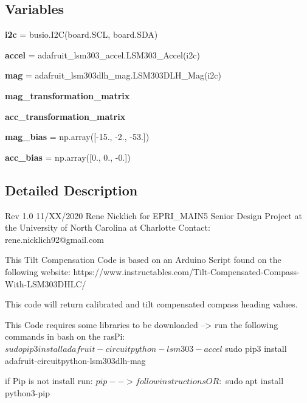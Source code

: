 \subsection*{Variables}
\begin{DoxyCompactItemize}
\item 
\mbox{\label{namespacemcs_1_1firmware_1_1lsm303dlhc_a2306e89ef0782283d496ce7141de2327}} 
{\bfseries i2c} = busio.\+I2C(board.\+S\+CL, board.\+S\+DA)
\item 
\mbox{\label{namespacemcs_1_1firmware_1_1lsm303dlhc_aefaaa0ccd56bd1aaf195733637535400}} 
{\bfseries accel} = adafruit\+\_\+lsm303\+\_\+accel.\+L\+S\+M303\+\_\+\+Accel(i2c)
\item 
\mbox{\label{namespacemcs_1_1firmware_1_1lsm303dlhc_aa61499d7e7a4675cc58185f941e1c4e2}} 
{\bfseries mag} = adafruit\+\_\+lsm303dlh\+\_\+mag.\+L\+S\+M303\+D\+L\+H\+\_\+\+Mag(i2c)
\item 
{\bfseries mag\+\_\+transformation\+\_\+matrix}
\item 
{\bfseries acc\+\_\+transformation\+\_\+matrix}
\item 
\mbox{\label{namespacemcs_1_1firmware_1_1lsm303dlhc_a3307f6f7c39bd45e8af32a162a7e33f3}} 
{\bfseries mag\+\_\+bias} = np.\+array(\mbox{[}-\/15., -\/2., -\/53.\mbox{]})
\item 
\mbox{\label{namespacemcs_1_1firmware_1_1lsm303dlhc_a7b137ee76c2c5af6710bafd80baf6e63}} 
{\bfseries acc\+\_\+bias} = np.\+array(\mbox{[}0., 0., -\/0.\mbox{]})
\end{DoxyCompactItemize}


\subsection{Detailed Description}
\begin{DoxyVerb}Rev 1.0 
11/XX/2020
Rene Nicklich for EPRI_MAIN5 Senior Design Project at the University of North Carolina at Charlotte
Contact: rene.nicklich92@gmail.com

This Tilt Compensation Code is based on an Arduino Script found on the following website:
https://www.instructables.com/Tilt-Compensated-Compass-With-LSM303DHLC/

This code will return calibrated and tilt compensated compass heading values.

This Code requires some libraries to be downloaded -->  run the following commands in bash on the rasPi:
$ sudo pip3 install adafruit-circuitpython-lsm303-accel
$ sudo pip3 install adafruit-circuitpython-lsm303dlh-mag

if Pip is not install run:
$ pip
--> follow instructions
OR:
$ sudo apt install python3-pip
\end{DoxyVerb}
 

